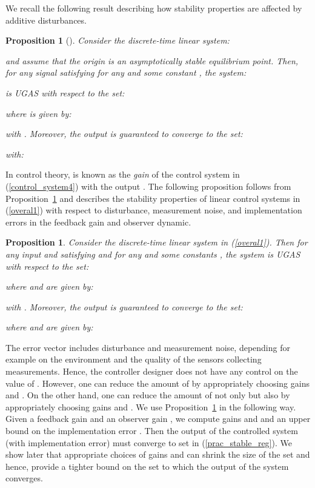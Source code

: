 \documentclass{amsart}
\newtheorem{proposition}[theorem]{Proposition}
\numberwithin{equation}{section}
\begin{document}
We recall the following result describing how stability properties are affected by additive disturbances.
\begin{proposition}[\cite{anta}]
\label{prop:anta}
Consider the discrete-time linear system:

and assume that the origin is an asymptotically stable equilibrium point. Then, for any signal  satisfying  for any  and some constant , the system:

is UGAS with respect to the set:
 
where  is given by:

with . Moreover, the output  is guaranteed to converge to the set:
  
with:

\end{proposition}

In control theory,  is known as the {\em  gain} of the control system in (\ref{control_system4}) with the output .
The following proposition follows from Proposition~\ref{prop:anta} and describes the stability properties of linear control systems in (\ref{overal1}) with 
respect to disturbance, measurement noise, and implementation errors in the feedback gain and observer dynamic. 

\begin{proposition}
\label{prac_stability1}
Consider the discrete-time linear system in (\ref{overal1}). Then for any input  and  satisfying  and  for any  and some
constants , the system is UGAS with respect to the set:
 
where  and  are given by: 

with . Moreover, the output  is guaranteed to converge to the set:

where  and  are given by: 

\end{proposition}

The error vector  includes disturbance and measurement noise, depending for example on the environment and the quality of the sensors collecting measurements. Hence, the controller designer does not have any control on the value of . However, one can reduce the amount of  by appropriately choosing gains  and . On the other hand, one can reduce the amount of not only  but also  by appropriately choosing gains  and . We use Proposition~\ref{prac_stability1} in the following way.
Given a feedback gain  and an observer gain , we compute  gains  and  and an upper bound  on the implementation error . Then the output of the controlled system (with
implementation error) must converge to set  in (\ref{prac_stable_reg}).
We show later that appropriate choices of gains  and  can shrink the size of the 
set  and hence, provide a tighter bound on the set 
to which the output of the system converges.
\end{document}
